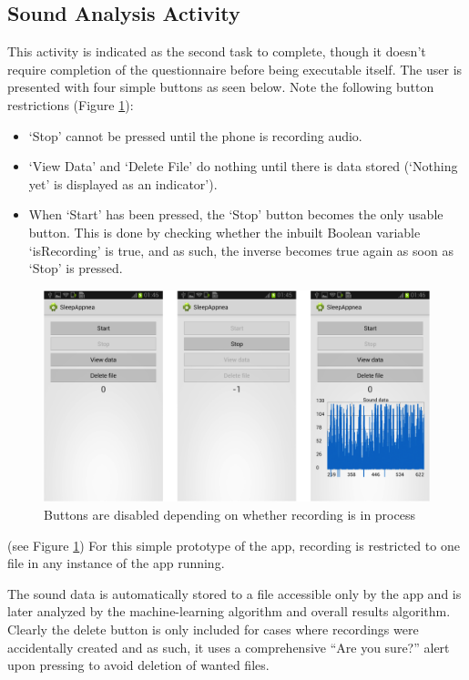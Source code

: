 \subsection{Sound Analysis Activity}
This activity is indicated as the second task to complete, though it doesn’t require completion of the questionnaire before being executable itself. The user is presented with four simple buttons as seen below. Note the following button restrictions (Figure \ref{fig:recordPages}):
\begin{itemize}
\item `Stop' cannot be pressed until the phone is recording audio.
\item `View Data' and ‘Delete File’ do nothing until there is data stored (‘Nothing yet’ is displayed as an indicator’).
\item When `Start' has been pressed, the ‘Stop’ button becomes the only usable button. This is done by checking whether the inbuilt Boolean variable ‘isRecording’ is true, and as such, the inverse becomes true again as soon as ‘Stop’ is pressed.
\end{itemize}
\begin{figure}[ht!]
		\centering
			\includegraphics[width=.9\textwidth]{drawings/Audiorecord_struct.png}
		\caption{Buttons are disabled depending on whether recording is in process}
		\label{fig:recordPages}
	\end{figure}
(see Figure \ref{fig:recordPages})
For this simple prototype of the app, recording is restricted to one file in any instance of the app running.

The sound data is automatically stored to a file accessible only by the app and is later analyzed by the machine-learning algorithm and overall results algorithm. Clearly the delete button is only included for cases where recordings were accidentally created and as such, it uses a comprehensive ``Are you sure?'' alert upon pressing to avoid deletion of wanted files.


